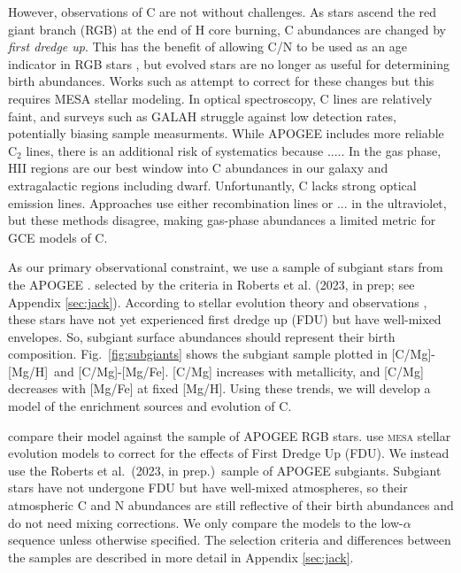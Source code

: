 \documentclass[fleqn,usenatbib]{mnras}
\newcommand{\citetjack}{Roberts et al.~(2023, in prep.)}
\newcommand{\apogee}{APOGEE}
\newcommand{\caah}{[C/Mg]-[Mg/H]}
\newcommand{\caafe}{[C/Mg]-[Mg/Fe]}
\begin{document}


However, observations of C are not without challenges. 
As stars ascend the red giant branch (RGB) at the end of H core burning, C abundances are changed by \textit{first dredge up}\footnotemark{}. This has the benefit of allowing C/N to be used as an age indicator in RGB stars \citep{MG15, martig16, hasselquist19, vincenzo+21}, but evolved stars are no longer as useful for determining birth abundances. Works such as \citet{vincenzo+21} attempt to correct for these changes but this requires MESA stellar modeling. 
In optical spectroscopy, C lines are relatively faint, and surveys such as GALAH struggle against low detection rates, potentially biasing sample measurments. While APOGEE includes more reliable C$_2$ lines, there is an additional risk of systematics because .....
In the gas phase, HII regions are our best window into C abundances in our galaxy and extragalactic regions including dwarf. 
Unfortunantly, C lacks strong optical emission lines. Approaches use either recombination lines or ... in the ultraviolet, but these methods disagree, making gas-phase abundances a limited metric for GCE models of C.


    As our primary observational constraint, we use a sample of subgiant stars from the \apogee{} \citep{apogee17}. selected by the criteria in Roberts et al. (2023, in prep; see Appendix \ref{sec:jack}).
According to stellar evolution theory and observations \citep{gilroy89, korn+07, lind+08, souto+18, souto19}, these stars have not yet experienced first dredge up (FDU) but have well-mixed envelopes. So, subgiant surface abundances should represent their birth composition. 
Fig.~\ref{fig:subgiants} shows the subgiant sample plotted in \caah\ and \caafe{}. [C/Mg] increases with metallicity, and [C/Mg] decreases with [Mg/Fe] at fixed [Mg/H]. 
Using these trends, we will develop a model of the enrichment sources and evolution of C.

\citet{james+23} compare their model against the \cite{vincenzo+21} sample of \apogee{} \citep{apogee17} RGB stars. \citet{vincenzo+21} use \textsc{mesa} stellar evolution models \citep{mesa} to correct for the effects of First Dredge Up (FDU). 
We instead use the \citetjack~sample of \apogee{} subgiants. Subgiant stars have not undergone FDU but have well-mixed atmospheres, so their atmospheric C and N abundances are still reflective of their birth abundances and do not need mixing corrections. We only compare the models to the low-$\alpha$ sequence unless otherwise specified.  The selection criteria and differences between the samples are described in more detail in Appendix \ref{sec:jack}.
\end{document}
